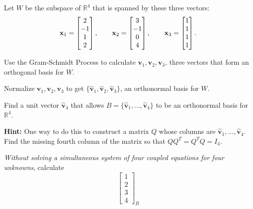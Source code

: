 \documentclass[boxes]{gsypset}
\begin{document}
\begin{problem}
	Let $W$ be the subspace of $\mathbb{R}^4$ that is spanned by these three vectors:
	\[
		\mathbf{x}_1=\begin{bmatrix}2\\-1\\1\\2\end{bmatrix},
		\qquad
		\mathbf{x}_2=\begin{bmatrix}3\\-1\\0\\4\end{bmatrix},
		\qquad
		\mathbf{x}_3=\begin{bmatrix}1\\1\\1\\1\end{bmatrix}.
	\]
	\begin{subproblems}
		\subproblem Use the Gram-Schmidt Process to calculate $\mathbf{v}_1,\mathbf{v}_2,\mathbf{v}_3$, 
			three vectors that form an orthogonal basis for $W$.
			\begin{solution}
				
			\end{solution}
		\subproblem Normalize $\mathbf{v}_1,\mathbf{v}_2,\mathbf{v}_3$ to get 
			$\{\hat{\mathbf{v}}_1,\hat{\mathbf{v}}_2,\hat{\mathbf{v}}_3\}$, an orthonormal basis for $W$.
			\begin{solution}
				
			\end{solution}
		\subproblem Find a unit vector $\hat{\mathbf{v}}_4$ that allows 
			$B=\{\hat{\mathbf{v}}_1,\dots,\hat{\mathbf{v}}_4\}$ to be an orthonormal basis for $\mathbb{R}^4$.
			
			\textbf{Hint:} One way to do this to construct a matrix $Q$ whose columns are 
			$\hat{\mathbf{v}}_1,\dots,\hat{\mathbf{v}}_4$. 
			Find the missing fourth column of the matrix so that $QQ^T=Q^TQ=I_4$.
			\begin{solution}
				
			\end{solution}
		\subproblem \textit{Without solving a simultaneous system of four coupled equations for four unknowns},
			calculate
			\[
				\left[\begin{matrix}1\\2\\3\\4\end{matrix}\right]_B
			\]
			\begin{solution}
				
			\end{solution}
	\end{subproblems}
\end{problem}
\end{document}
